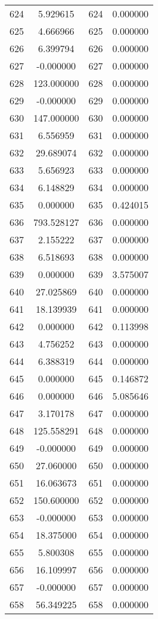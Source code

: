 \documentclass[12pt]{article}
\begin{document}
\begin{longtable}{@{}cccc@{}}
624 & 5.929615 & 624 & 0.000000 \\
625 & 4.666966 & 625 & 0.000000 \\
626 & 6.399794 & 626 & 0.000000 \\
627 & -0.000000 & 627 & 0.000000 \\
628 & 123.000000 & 628 & 0.000000 \\
629 & -0.000000 & 629 & 0.000000 \\
630 & 147.000000 & 630 & 0.000000 \\
631 & 6.556959 & 631 & 0.000000 \\
632 & 29.689074 & 632 & 0.000000 \\
633 & 5.656923 & 633 & 0.000000 \\
634 & 6.148829 & 634 & 0.000000 \\
635 & 0.000000 & 635 & 0.424015 \\
636 & 793.528127 & 636 & 0.000000 \\
637 & 2.155222 & 637 & 0.000000 \\
638 & 6.518693 & 638 & 0.000000 \\
639 & 0.000000 & 639 & 3.575007 \\
640 & 27.025869 & 640 & 0.000000 \\
641 & 18.139939 & 641 & 0.000000 \\
642 & 0.000000 & 642 & 0.113998 \\
643 & 4.756252 & 643 & 0.000000 \\
644 & 6.388319 & 644 & 0.000000 \\
645 & 0.000000 & 645 & 0.146872 \\
646 & 0.000000 & 646 & 5.085646 \\
647 & 3.170178 & 647 & 0.000000 \\
648 & 125.558291 & 648 & 0.000000 \\
649 & -0.000000 & 649 & 0.000000 \\
650 & 27.060000 & 650 & 0.000000 \\
651 & 16.063673 & 651 & 0.000000 \\
652 & 150.600000 & 652 & 0.000000 \\
653 & -0.000000 & 653 & 0.000000 \\
654 & 18.375000 & 654 & 0.000000 \\
655 & 5.800308 & 655 & 0.000000 \\
656 & 16.109997 & 656 & 0.000000 \\
657 & -0.000000 & 657 & 0.000000 \\
658 & 56.349225 & 658 & 0.000000 \\

\end{longtable}
\end{document}
